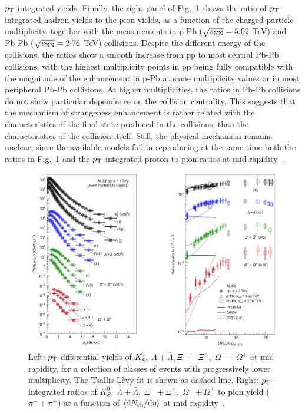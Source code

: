      $p_{\rm T}$-integrated yields. Finally, the right panel of Fig.~\ref{fig:StrangenessALICEpp}
      shows the ratio of $p_{\rm T}$-integrated hadron yields to the pion yields, as a 
      function of the charged-particle multiplicity, together with the measurements
       in p-Pb ($\sqrt{s_{\rm NN}} = 5.02$ TeV) and Pb-Pb ($\sqrt{s_{\rm NN}} = 2.76$ TeV) collisions. 
       Despite the different energy of the collisions, the ratios show a smooth 
       increase from pp to most central Pb-Pb collisions, with the highest multiplicity 
       points in pp being fully compatible with the magnitude of the enhancement in 
       p-Pb at same multiplicity values or in most peripheral Pb-Pb collisions. At higher multiplicities,
       the ratios in Pb-Pb collisions do not show particular dependence on the collision centrality. This 
       suggests that the mechanism of strangeness enhancement is rather related
        with the characteristics of the final state produced in the collisions, than the
         characteristics of the collision itself. Still, the physical mechanism remains 
         unclear, since the available models fail in reproducing at the same time both
          the ratios in Fig.~\ref{fig:StrangenessALICEpp} and the $p_{\rm T}$-integrated 
          proton to pion ratios at mid-rapidity~\cite{ALICE:2017jyt}.
\begin{figure}[!ht]
  \centering
  \includegraphics[width=14cm]{FigCap1/StrangenessALICEpp.png}
  \caption{Left: $p_{\rm T}$-differential yields of $K^0_S,\; \Lambda + \bar{\Lambda}, \Xi^- + \Xi^+,\; \Omega^- + \Omega^+$ at mid-rapidity, for a selection of classes of events with progressively lower multiplicity. The Tsallis-L\`evy fit is shown as dashed line. Right: $p_{\rm T}$-integrated ratios of $K^0_S,\; \Lambda + \bar{\Lambda},\; \Xi^- + \Xi^+,\; \Omega^- + \Omega^+$ to pion yield ($\pi^- + \pi^+$) as a function of $\langle{\rm d}N_{\rm ch}/{\rm d}\eta \rangle$ at mid-rapidity~\cite{ALICE:2017jyt}.}
  \label{fig:StrangenessALICEpp}
\end{figure}













